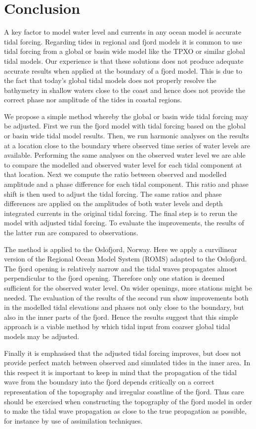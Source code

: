 \section{Conclusion}

A key factor to model water level and currents in any ocean model is accurate tidal forcing. Regarding tides in regional and fjord models it is common to use tidal forcing from a global or basin wide model like the TPXO or similar global tidal models. Our experience is that these solutions does not produce adequate accurate results when applied at the boundary of a fjord model. This is due to the fact that today's global tidal models does not properly resolve the bathymetry in shallow waters close to the coast and hence does not provide the correct phase nor amplitude of the tides in coastal regions. 

We propose a simple method whereby the global or basin wide tidal forcing may be adjusted. First we run the fjord model with tidal forcing based on the global or basin wide tidal model results. Then, we run harmonic analyses on the results at a location close to the boundary where observed time series of water levels are available. Performing the same analyses on the observed water level we are able to compare the modelled and observed water level for each tidal component at that location. Next we compute the ratio between observed and modelled amplitude and a phase difference for each tidal component. This ratio and phase shift is then used to adjust the tidal forcing. The same ratios and phase differences are applied on the amplitudes of both water levels and depth integrated currents in the original tidal forcing. The final step is to rerun the model with adjusted tidal forcing. To evaluate the improvements, the results of the latter run are compared to observations.

The method is applied to the Oslofjord, Norway. Here we apply a curvilinear version of the Regional Ocean Model System (ROMS) adapted to the Oslofjord. The fjord opening is relatively narrow and the tidal waves propagates almost perpendicular to the fjord opening. Therefore only one station is deemed sufficient for the observed water level. On wider openings, more stations might be needed. The evaluation of the results of the second run show improvements both in the modelled tidal elevations and phases not only close to the boundary, but also in the inner parts of the fjord. Hence the results suggest that this simple approach is a viable method by which tidal input from coarser global tidal models may be adjusted. 

Finally it is emphasised that the adjusted tidal forcing improves, but does not provide perfect match between observed and simulated tides in the inner area. In this respect it is important to keep in mind that the propagation of the tidal wave from the boundary into the fjord depends critically on a correct representation of the topography and irregular coastline of the fjord. 
 Thus care should be exercised when constructing the topography of the fjord model in order to make the tidal wave propagation as close to the true propagation as possible, for instance by use of assimilation techniques.
